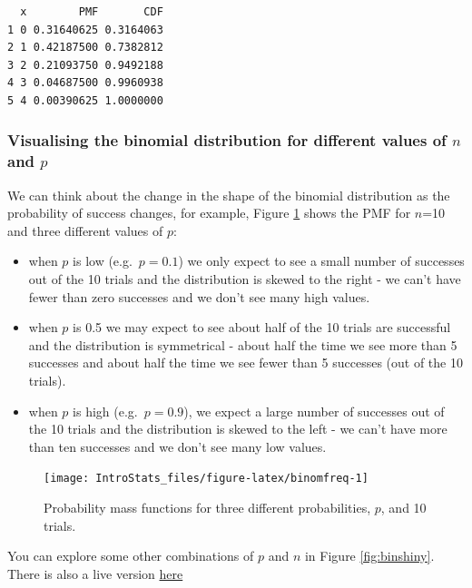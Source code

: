 \documentclass[
  oneside]{krantz}
\begin{document}
\begin{verbatim}
  x        PMF       CDF
1 0 0.31640625 0.3164063
2 1 0.42187500 0.7382812
3 2 0.21093750 0.9492188
4 3 0.04687500 0.9960938
5 4 0.00390625 1.0000000
\end{verbatim}

\hypertarget{visualising-the-binomial-distribution-for-different-values-of-n-and-p}{%
\subsubsection{\texorpdfstring{Visualising the binomial distribution for different values of \(n\) and \(p\)}{Visualising the binomial distribution for different values of n and p}}\label{visualising-the-binomial-distribution-for-different-values-of-n-and-p}}

We can think about the change in the shape of the binomial distribution as the probability of success changes, for example, Figure \ref{fig:binomfreq} shows the PMF for \(n\)=10 and three different values of \(p\):

\begin{itemize}
\item
  when \(p\) is low (e.g.~\(p=0.1\)) we only expect to see a small number of successes out of the 10 trials and the distribution is skewed to the right - we can't have fewer than zero successes and we don't see many high values.
\item
  when \(p\) is 0.5 we may expect to see about half of the 10 trials are successful and the distribution is symmetrical - about half the time we see more than 5 successes and about half the time we see fewer than 5 successes (out of the 10 trials).
\item
  when \(p\) is high (e.g.~\(p=0.9\)), we expect a large number of successes out of the 10 trials and the distribution is skewed to the left - we can't have more than ten successes and we don't see many low values.
\end{itemize}

\begin{figure}

{\centering \texttt{[image: IntroStats\_files/figure-latex/binomfreq-1]} 

}

\caption{Probability mass functions for three different probabilities, $p$, and 10 trials.}\label{fig:binomfreq}
\end{figure}

You can explore some other combinations of \(p\) and \(n\) in Figure \ref{fig:binshiny}. There is also a live version \href{https://moniquemackenzie.shinyapps.io/IntroStats_Binomial/}{here}
\end{document}
